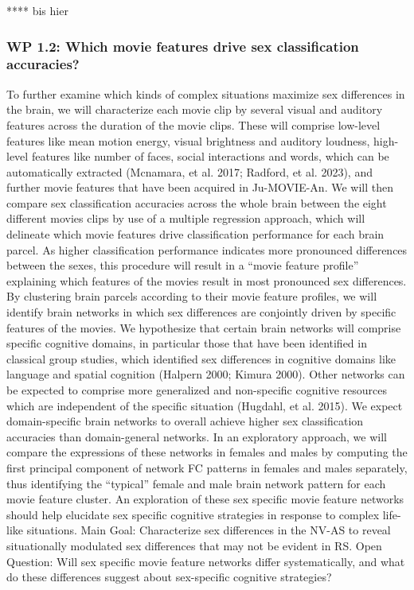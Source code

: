 \documentclass[11pt,a4paper]{article}
\begin{document}
**** bis hier

\subsubsection*{WP 1.2: Which movie features drive sex classification accuracies?}
To further examine which kinds of complex situations maximize sex differences in the brain, we will characterize each movie 
clip by several visual and auditory features across the duration of the movie clips. These will comprise low-level features like mean 
motion energy, visual brightness and auditory loudness, high-level features like number of faces, social interactions and words, 
which can be automatically extracted (Mcnamara, et al. 2017; Radford, et al. 2023), 
and further movie features that have been acquired in Ju-MOVIE-An. We will then compare sex classification accuracies 
across the whole brain between the eight different movies clips by use of a multiple regression approach, which will 
delineate which movie features drive classification performance for each brain parcel. 
As higher classification performance indicates more pronounced differences between the sexes, this procedure will 
result in a “movie feature profile” explaining which features of the movies result in most pronounced sex differences. 
By clustering brain parcels according to their movie feature profiles, we will identify brain networks in which sex 
differences are conjointly driven by specific features of the movies. We hypothesize that certain brain 
networks will comprise specific cognitive domains, in particular those that have been identified in 
classical group studies, which identified sex differences in cognitive domains like language and spatial cognition (Halpern 2000; Kimura 2000). Other networks can be expected to comprise more generalized and non-specific cognitive resources which are independent of the specific situation (Hugdahl, et al. 2015). We expect domain-specific brain networks to overall achieve higher sex classification accuracies than domain-general networks.
In an exploratory approach, we will compare the expressions of these networks in females and males by 
computing the first principal component of network FC patterns in females and males separately, 
thus identifying the “typical” female and male brain network pattern for each movie feature cluster. An exploration of these sex specific movie feature networks should help elucidate sex specific cognitive strategies in response to complex life-like situations. 
Main Goal: Characterize sex differences in the NV-AS to reveal situationally modulated sex differences 
that may not be evident in RS.
Open Question: Will sex specific movie feature networks differ systematically, 
and what do these differences suggest about sex-specific cognitive strategies?



\printbibliography
\end{document}

